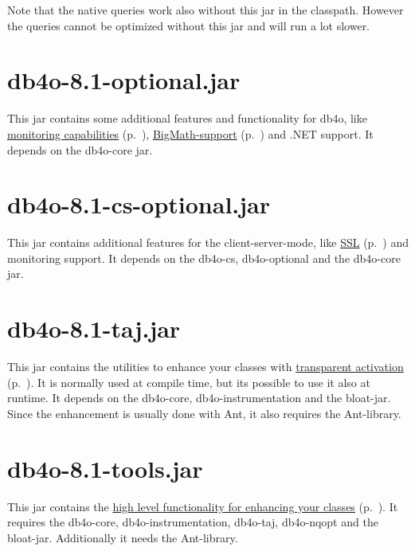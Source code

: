 Note that the native queries work also without this jar in the classpath. However the queries cannot be optimized without this jar and will run a lot slower.

\section*{db4o-8.1-optional.jar}

This jar contains some additional features and functionality for db4o, like \hyperref[ref:advanced-topics-runtime-statistics]{monitoring capabilities} (p.~\pageref{ref:advanced-topics-runtime-statistics}), \hyperref[ref:advanced-topics-type-handling-bigmath]{BigMath-support} (p.~\pageref{ref:advanced-topics-type-handling-bigmath}) and .NET support. It depends on the db4o-core jar.

\section*{db4o-8.1-cs-optional.jar}

This jar contains additional features for the client-server-mode, like \hyperref[ref:client-server-pluggable-sockets-using-ssl-for-client-server-communication]{SSL} (p.~\pageref{ref:client-server-pluggable-sockets-using-ssl-for-client-server-communication}) and monitoring support. It depends on the db4o-cs, db4o-optional and the db4o-core jar.

\section*{db4o-8.1-taj.jar}

This jar contains the utilities to enhance your classes with \hyperref[ref:advanced-topics-enhancement-tools]{transparent activation} (p.~\pageref{ref:advanced-topics-enhancement-tools}). It is normally used at compile time, but its possible to use it also at runtime. It depends on the db4o-core, db4o-instrumentation and the bloat-jar. Since the enhancement is usually done with Ant, it also requires the Ant-library.

\section*{db4o-8.1-tools.jar}

This jar contains the \hyperref[ref:advanced-topics-enhancement-tools]{high level functionality for enhancing your classes} (p.~\pageref{ref:advanced-topics-enhancement-tools}). It requires the db4o-core, db4o-instrumentation, db4o-taj, db4o-nqopt and the bloat-jar. Additionally it needs the Ant-library.

